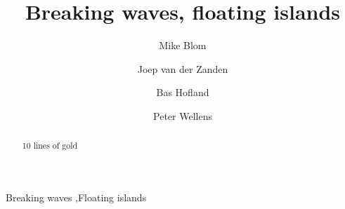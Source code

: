 \documentclass[final,3p,times]{elsarticle}
\begin{document}
\begin{frontmatter}


\title{Breaking waves, floating islands}

\author{Mike Blom}
\address{Delft University of Technology, Mekelweg 2 2628CD Delft}

\author{Joep van der Zanden}
\address{Delft University of Technology, Mekelweg 2 2628CD Delft}

\author{Bas Hofland}
\address{Delft University of Technology, Mekelweg 2 2628CD Delft}

\author{Peter Wellens}
\address{Delft University of Technology, Mekelweg 2 2628CD Delft}
\cortext[cor2]{} 

% 
\begin{abstract}
10 lines of gold
\end{abstract}

\begin{keyword}
Breaking waves \sep Floating islands
\end{keyword}

\end{frontmatter}

























 

\end{document}
